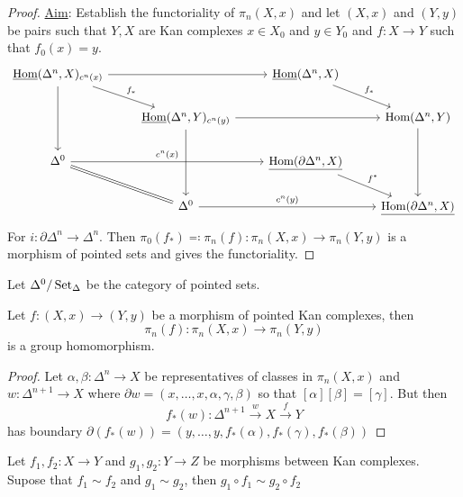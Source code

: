 \begin{proof}
\underline{Aim}: Establish the functoriality of $\pi_n(X,x)$ and let $(X,x)$ and $(Y,y)$ be pairs such that $Y,X$ are Kan complexes $x \in X_0$ and $y \in Y_0$ and $f\colon X \to Y$ such that $f_0(x)=y$.
\[
    \begin{tikzcd}
        \underline{\Hom}(\Delta^n,X)_{c^n(x)}
        \ar[dd]
        \ar[rr]
        \ar[rd, "f_*"]
        &&
        \underline{\Hom}(\Delta^n,X)
        \ar[rd, "f_*"]
        &
        \\
        &
        \underline{\Hom}(\Delta^n,Y)_{c^n(y)}
        \ar[dd]
        \ar[rr]
        &&
        \Hom(\Delta^n,Y)
        \ar[dd]
        \\
        \Delta^0
        \ar[rd, equal]
        \ar[rr, "c^n(x)"]
        &&
        \underline{\Hom(\partial \Delta^n,X)}
        \ar[rd, "f^*"]
        &
        \\
        &
        \Delta^0
        \ar[rr, "c^n(y)"]
        &&
        \underline{\Hom(\partial \Delta^n, X)}
    \end{tikzcd}
\]
For $i \colon \partial \Delta^n \to \Delta^n$.
Then $\pi_0(f_*) \eqqcolon \pi_n(f) \colon \pi_n(X,x) \to \pi_n(Y,y)$ is a morphism of pointed sets and gives the functoriality.
\end{proof}

\begin{defi}
    Let $\Delta^0/\operatorname{Set}_{\Delta}$ be the category of pointed sets.
\end{defi}

\begin{prop}
    Let $f\colon (X,x) \to (Y,y)$ be a morphism of pointed Kan complexes, then 
    \[
    \pi_n(f) \colon \pi_n(X,x) \to \pi_n(Y,y) 
    \]
    is a group homomorphism.
\end{prop}

\begin{proof}
    Let $\alpha, \beta \colon \Delta^n \to X$ be representatives of classes in $\pi_n(X,x)$ and
    $w \colon \Delta^{n+1} \to X$ where $\partial w = (x, \dotsc ,x , \alpha, \gamma , \beta)$ so that 
    $[\alpha][\beta]=[\gamma]$. But then
    \[
    f_*(w)\colon \Delta^{n+1}\xrightarrow{w}X \xrightarrow{f}Y
    \]
    has boundary $\partial (f_*(w))=(y, \dotsc , y, f_*(\alpha),f_*(\gamma),f_*(\beta))$
\end{proof}

\begin{prop}
    Let $f_1, f_2 \colon X \to Y$ and $g_1, g_2 \colon Y \to Z$ be morphisms between Kan complexes.
    Supose that $f_1 \sim f_2$ and $g_1 \sim g_2$, then $ g_1 \circ f_1 \sim g_2 \circ f_2$
\end{prop}

